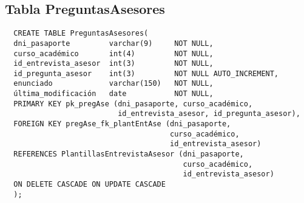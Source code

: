 \subsection{Tabla PreguntasAsesores}

\begin{verbatim}
  CREATE TABLE PreguntasAsesores(
  dni_pasaporte         varchar(9)     NOT NULL,
  curso_académico       int(4)         NOT NULL,
  id_entrevista_asesor  int(3)         NOT NULL,
  id_pregunta_asesor    int(3)         NOT NULL AUTO_INCREMENT,
  enunciado             varchar(150)   NOT NULL,
  última_modificación   date           NOT NULL,
  PRIMARY KEY pk_pregAse (dni_pasaporte, curso_académico,
                          id_entrevista_asesor, id_pregunta_asesor),
  FOREIGN KEY pregAse_fk_plantEntAse (dni_pasaporte,
                                      curso_académico,
                                      id_entrevista_asesor)
  REFERENCES PlantillasEntrevistaAsesor (dni_pasaporte,
                                         curso_académico,
                                         id_entrevista_asesor)
  ON DELETE CASCADE ON UPDATE CASCADE
  );
\end{verbatim}
